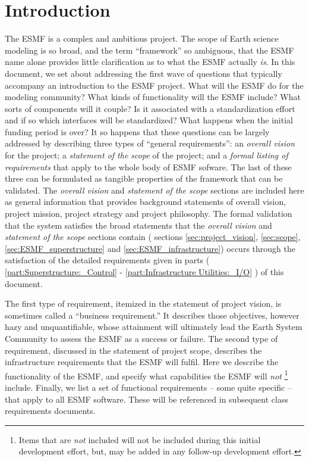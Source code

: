 \section{Introduction}
The ESMF is a complex and ambitious 
project.   The scope of Earth science modeling is so broad, and the 
term ``framework'' so ambiguous, that the ESMF name alone provides 
little clarification as to what the ESMF actually {\it is}.  In 
this document, we set about addressing the first wave of questions that 
typically accompany an introduction to the ESMF project.  What will the 
ESMF do for the modeling community?  What kinds of functionality will the ESMF 
include?  What sorts of components will it couple?  Is it associated with 
a standardization effort and if so which interfaces will be 
standardized?  What happens when the initial funding period is over?  
It so happens that these questions can be largely addressed by
describing three types of ``general requirements'': an {\it overall vision}
for the project; a {\it statement of the scope} of the project; and a {\it formal listing of requirements} that apply to the whole body of ESMF sofware.
The last of these three can be formulated as tangible properties of the 
framework that can be validated. The {\it overall vision} and {\it statement of 
the scope} sections are included here as general information that provides
background statements of overall vision, project mission, project strategy
and project philosophy. The formal validation that the system satisfies the
broad statements that the {\it overall vision} and {\it statement of the scope} 
sections contain ( sections \ref{sec:project_vision}, \ref{sec:scope}, \ref{sec:ESMF_superstructure} and \ref{sec:ESMF_infrastructure}) occurs through the 
satisfaction of the detailed requirements given in parts  
( \ref{part:Superstructure:_Control} - 
\ref{part:Infrastructure Utilities:_I/O} ) of this document.  

The first type of requirement, itemized in the statement of project
vision, is sometimes called a ``business requirement.'' \cite{wiegers}
It describes those objectives, however hazy and unquantifiable, whose
attainment will ultimately lead the Earth System Community to assess
the ESMF as a success or failure.  The second type of requirement,
discussed in the statement of project scope, describes the
infrastructure requirements that the ESMF will fulfil.  Here we
describe the functionality of the ESMF, and specify what capabilities
the ESMF will {\it not} 
\footnote{ Items that are {\it not}
included will not be included during this initial development
effort, but, may be added in any follow-up
development effort.}
include.
Finally, we list a set of functional
requirements -- some quite specific -- that apply to all ESMF
software.  These will be referenced in subsequent class requirements
documents. 





